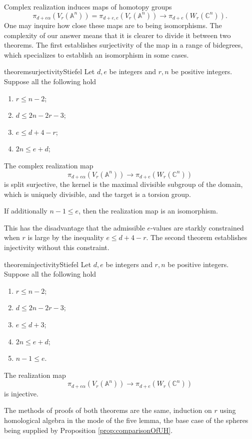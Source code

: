 \documentclass[11pt, oneside, dvipsnames, svgnames, table, final]{amsart}
\newcommand{\mathbx}[1]{\mathbb{#1}}
\theoremstyle{plain}
\theoremstyle{definition}
\theoremstyle{remark}
\newcommand{\C}{\mathbx{C}}
\newcommand{\A}{\mathbx{A}}
\newcommand{\<}[1]{{\langle}#1 {\rangle}}
\begin{document}
Complex realization induces maps of homotopy groups
\[  \pi_{d+e\alpha}(V_r(\A^n)) = \pi_{d+e,e}(V_r(\A^n)) \to \pi_{d+e}(W_r(\C^n)).\]
One may inquire how close these maps are to being isomorphisms. The complexity of our answer means that it is clearer to divide it between two theorems. The first establishes surjectivity of the map in a range of bidegrees, which specializes to establish an isomorphism in some cases.
\begin{restatable}{theorem}{surjectivityStiefel}\label{th:surjectivityStiefel}
  Let $d,e$ be integers and $r,n$ be positive integers. Suppose all the following hold
  \begin{enumerate}
  \item\label{ineq:f} $r \le n-2$;
  \item $d \le 2n-2r-3$;
  \item $e \le d+4-r$;
  \item\label{ineq:z} $2n \le e+d$;
  \end{enumerate}
  The complex realization map
  \[ \pi_{d+e\alpha}(V_r(\A^n)) \to \pi_{d+e}(W_r(\C^n)) \]
  is split surjective, the kernel is the maximal divisible subgroup of the domain, which is uniquely divisible, and the target is a torsion group.

  If additionally $n-1 \le e$, then the realization map is an isomorphism.
\end{restatable}
This has the disadvantage that the admissible $e$-values are starkly constrained when $r$ is large by the inequality $e \le d + 4 -r$. The second theorem establishes injectivity without this constraint.
\begin{restatable}{theorem}{injectivityStiefel} \label{th:injectivityStiefel}
  Let $d,e$ be integers and $r,n$ be positive integers. Suppose all the following hold
  \begin{enumerate}
  \item\label{ineq:fprime} $r \le n-2$;
  \item\label{ineq:needsrn2} $d \le 2n-2r-3$;
  \item $e \le d+3$;
  \item $2n \le e+d$;
  \item\label{ineq:zprime} $n-1 \le e$.
  \end{enumerate}
  The realization map
  \[ \pi_{d+e\alpha}(V_r(\A^n)) \to \pi_{d+e}(W_r(\C^n)) \]
  is injective.
\end{restatable}
The methods of proofs of both theorems are the same, induction on $r$ using homological algebra in the mode of the five lemma, the base case of the spheres being supplied by Proposition \ref{prop:comparisonOfUH}.
\end{document}
